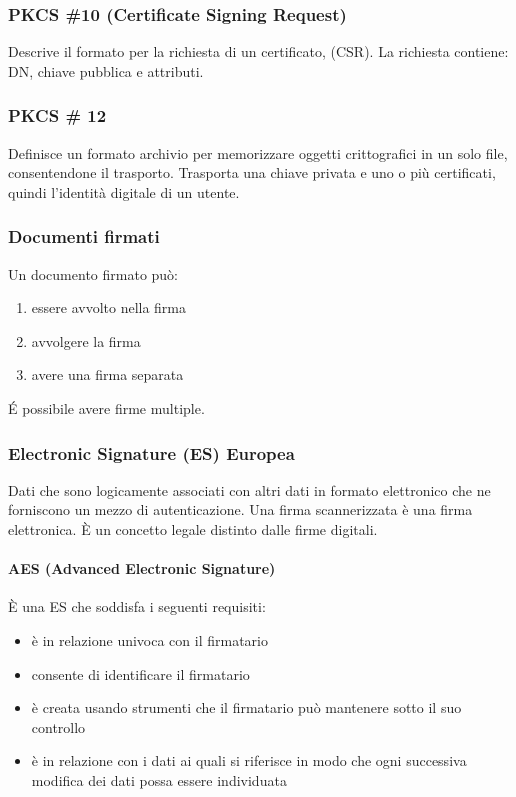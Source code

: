 \documentclass[11pt]{article}
\begin{document}
\subsubsection{PKCS \#10 (Certificate Signing Request)}
Descrive il formato per la richiesta di un certificato, (CSR). La richiesta contiene: DN, chiave pubblica e attributi.
\subsubsection{PKCS \# 12}
Definisce un formato archivio per memorizzare oggetti crittografici in un solo file, consentendone il trasporto. Trasporta 
una chiave privata e uno o più certificati, quindi l'identità digitale di un utente.
\subsubsection{Documenti firmati}
Un documento firmato può:
\begin{enumerate}
    \item essere avvolto nella firma
    \item avvolgere la firma 
    \item avere una firma separata 
\end{enumerate}
É possibile avere firme multiple. 
\subsubsection{Electronic Signature (ES) Europea}
Dati che sono logicamente associati con altri dati in formato elettronico che ne forniscono un mezzo di autenticazione.
Una firma scannerizzata è una firma elettronica. È un concetto legale distinto dalle firme digitali.
\paragraph*{AES (Advanced Electronic Signature)}
È una ES che soddisfa i seguenti requisiti:
\begin{itemize}
    \item è in relazione univoca con il firmatario
    \item consente di identificare il firmatario 
    \item è creata usando strumenti che il firmatario può mantenere sotto il suo controllo 
    \item è in relazione con i dati ai quali si riferisce in modo che ogni successiva modifica dei dati possa essere individuata 
\end{itemize}
\end{document}
